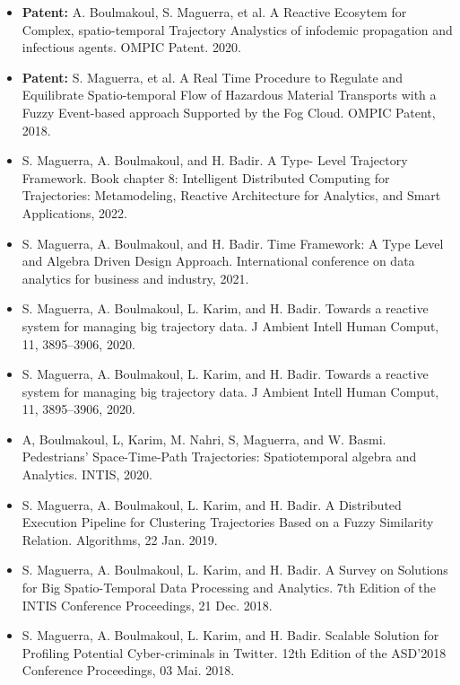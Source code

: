 %
%
%

\vspace{1em}
\begin{itemize}
	\item {\bf Patent:} A. Boulmakoul, S. Maguerra, et al. A Reactive Ecosytem for Complex, spatio-temporal Trajectory Analystics of infodemic propagation and infectious agents. OMPIC Patent. 2020.
	\item {\bf Patent:} S. Maguerra, et al. A Real Time Procedure to Regulate and Equilibrate Spatio-temporal Flow of Hazardous Material Transports with a Fuzzy Event-based approach Supported by the Fog Cloud. OMPIC Patent, 2018.
	\item S. Maguerra, A. Boulmakoul, and H. Badir. A Type- Level Trajectory Framework. Book chapter 8:  Intelligent Distributed Computing for Trajectories: Metamodeling, Reactive Architecture for Analytics, and Smart Applications, 2022.
	\item S. Maguerra, A. Boulmakoul, and H. Badir. Time Framework: A Type Level and Algebra Driven Design Approach. International conference on data analytics for business and industry, 2021.
	\item S. Maguerra, A. Boulmakoul, L. Karim, and H. Badir. Towards a reactive system for managing big trajectory data. J Ambient Intell Human Comput, 11, 3895–3906, 2020.
	\item S. Maguerra, A. Boulmakoul, L. Karim, and H. Badir. Towards a reactive system for managing big trajectory data. J Ambient Intell Human Comput, 11, 3895–3906, 2020.
	\item A, Boulmakoul, L, Karim, M. Nahri, S, Maguerra, and W. Basmi. Pedestrians' Space-Time-Path Trajectories: Spatiotemporal algebra and Analytics. INTIS, 2020. 
	\item S. Maguerra, A. Boulmakoul, L. Karim, and H. Badir. A Distributed Execution Pipeline for Clustering Trajectories Based on a Fuzzy Similarity Relation. Algorithms, 22 Jan. 2019.
	\item S. Maguerra, A. Boulmakoul, L. Karim, and H. Badir. A Survey on Solutions for Big Spatio-Temporal Data Processing and Analytics. 7th Edition of the INTIS Conference Proceedings, 21 Dec. 2018.
	\item S. Maguerra, A. Boulmakoul, L. Karim, and H. Badir. Scalable Solution for Profiling Potential Cyber-criminals in Twitter. 12th Edition of the ASD’2018 Conference Proceedings, 03 Mai. 2018.

\end{itemize}

